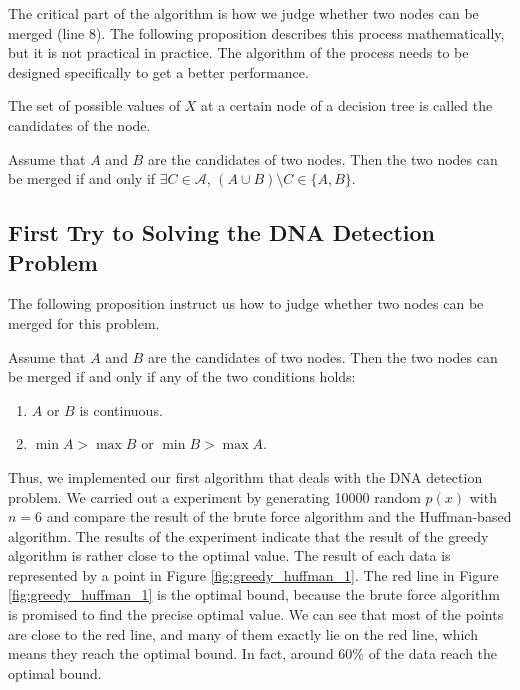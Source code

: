 The critical part of the algorithm is how we judge whether two nodes can be merged (line 8). The following proposition describes this process mathematically, but it is not practical in practice. The algorithm of the process needs to be designed specifically to get a better performance.

\begin{definition}
The set of possible values of $X$ at a certain node of a decision tree is called the candidates of the node.
\end{definition}

\begin{proposition}
Assume that $A$ and $B$ are the candidates of two nodes. Then the two nodes can be merged if and only if $\exists C \in \mathscr{A}$, $(A \cup B)\setminus C \in \{A, B\}$.
\end{proposition}

\subsection{First Try to Solving the DNA Detection Problem}

The following proposition instruct us how to judge whether two nodes can be merged for this problem.

\begin{proposition}
Assume that $A$ and $B$ are the candidates of two nodes. Then the two nodes can be merged if and only if any of the two conditions holds:
    \begin{enumerate}
        \item $A$ or $B$ is continuous.
        \item $\min A > \max B$ or $\min B > \max A$.
    \end{enumerate}
\end{proposition}

Thus, we implemented our first algorithm that deals with the DNA detection problem. We carried out a experiment by generating \num{10000} random $p(x)$ with $n=6$ and compare the result of the brute force algorithm and the Huffman-based algorithm. The results of the experiment indicate that the result of the greedy algorithm is rather close to the optimal value. The result of each data is represented by a point in Figure \ref{fig:greedy_huffman_1}. The red line in Figure \ref{fig:greedy_huffman_1} is the optimal bound, because the brute force algorithm is promised to find the precise optimal value. We can see that most of the points are close to the red line, and many of them exactly lie on the red line, which means they reach the optimal bound. In fact, around $60\%$ of the data reach the optimal bound.

